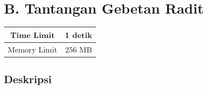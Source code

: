 \documentclass{article}
\begin{document}
\section*{\hfil B. Tantangan Gebetan Radit\hfil}

\begin{center}
\begin{tabular}{ |cc| } 
 \hline
 Time Limit & 1 detik \\ 
 \hline
 Memory Limit & 256 MB \\
 \hline
\end{tabular}
\end{center}

\subsection*{Deskripsi}
\end{document}
